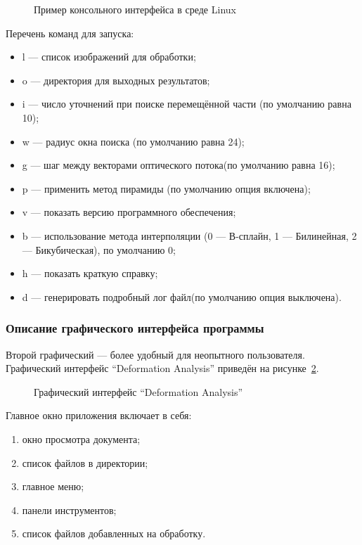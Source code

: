 \begin{figure}[h!]
\caption{Пример консольного интерфейса в среде Linux}
\label{pic:con_scr}
\end{figure}

Перечень команд для запуска:
\begin{itemize}
\item l — список изображений для обработки;
\item o — директория для выходных результатов;
\item i — число уточнений при поиске перемещённой части (по умолчанию равна 10);
\item w — радиус окна поиска (по умолчанию равна 24);
\item g — шаг между векторами оптического потока(по умолчанию равна 16);
\item p — применить метод пирамиды (по умолчанию опция включена);
\item v — показать версию программного обеспечения;
\item b — использование метода интерполяции (0 — В-сплайн, 1 — Билинейная, 2 — Бикубическая), по умолчанию 0;
\item h — показать краткую справку;
\item d — генерировать подробный лог файл(по умолчанию опция выключена).
\end{itemize}
\subsubsection{Описание графического интерфейса программы}
Второй графический — более удобный для неопытного пользователя. Графический интерфейс ``Deformation Analysis'' приведён на рисунке~\ref{pic:gui_scr}. 
\begin{figure}[h!]
\caption{Графический интерфейс ``Deformation Analysis''}
\label{pic:gui_scr}
\end{figure}
Главное окно приложения включает в себя:
\begin{enumerate}
\item окно просмотра документа;
\item список файлов в директории;
\item главное меню;
\item панели инструментов;
\item список файлов добавленных на обработку.
\end{enumerate}

